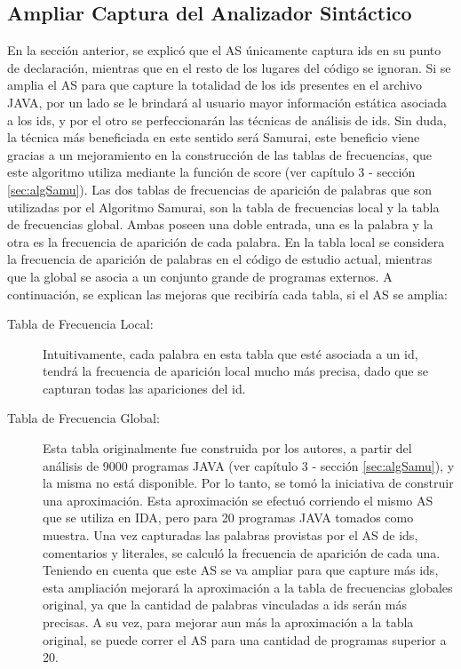\subsection{Ampliar Captura del Analizador Sintáctico}

En la sección anterior, se explicó que el AS únicamente captura ids en su punto de declaración, mientras que en el resto de los lugares del código se ignoran.
Si se amplia el AS para que capture la totalidad de los ids presentes en el archivo JAVA, por un lado se le brindará al usuario mayor información estática asociada a los ids, y por el otro se perfeccionarán las técnicas de análisis de ids. 
Sin duda, la técnica más beneficiada en este sentido será Samurai, este beneficio viene gracias a un mejoramiento en la construcción de las tablas de frecuencias, que este algoritmo utiliza mediante la función de score (ver capítulo 3 - sección \ref{sec:algSamu}). 
Las dos tablas de frecuencias de aparición de palabras que son utilizadas por el Algoritmo Samurai, son la tabla de frecuencias local y la tabla de frecuencias global.
Ambas poseen una doble entrada, una es la palabra y la otra es la frecuencia de aparición de cada palabra. En la tabla local se considera la frecuencia de aparición de palabras en el código de estudio actual, mientras que la global se asocia a un conjunto grande de programas externos. A continuación, se explican las mejoras que recibiría cada tabla, si el AS se amplia:
\pagebreak
\begin{description}
\item[Tabla de Frecuencia Local:] Intuitivamente, cada palabra en esta tabla que esté asociada a un id, tendrá la frecuencia de aparición local mucho más precisa, dado que se capturan todas las apariciones del id.

\item[Tabla de Frecuencia Global:] Esta tabla originalmente fue construida por los autores, a partir del análisis de 9000 programas JAVA (ver capítulo 3 - sección \ref{sec:algSamu}), y la misma no está disponible. Por lo tanto, se tomó la iniciativa de construir una aproximación. Esta aproximación se efectuó corriendo el mismo AS que se utiliza en IDA, pero para 20 programas JAVA tomados como muestra. Una vez capturadas las palabras provistas por el AS de ids, comentarios y literales, se calculó la frecuencia de aparición de cada una.
Teniendo en cuenta que este AS se va ampliar para que capture más ids, esta ampliación mejorará la aproximación a la tabla de frecuencias globales original, ya que la cantidad de palabras vinculadas a ids serán más precisas. A su vez, para mejorar aun más la aproximación a la tabla original, se puede correr el AS para una cantidad de programas superior a 20.

\end{description}


